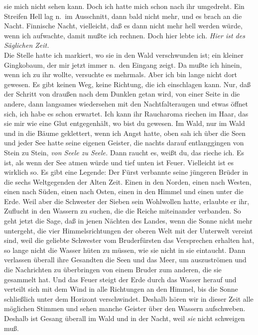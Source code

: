 \documentclass[
]{article}
\begin{document}
sie mich nicht sehen kann. Doch ich hatte mich schon nach ihr umgedreht.
Ein Streifen Hell lag n.~im Ausschnitt, dann bald nicht mehr, und es
brach an die Nacht. Finnische Nacht, vielleicht, daß es dann nicht mehr
hell werden würde, wenn ich aufwachte, damit mußte ich rechnen. Doch
hier lebte ich. \emph{Hier ist des Säglichen Zeit.}\\
Die Stelle hatte ich markiert, wo sie in den Wald verschwunden ist; ein
kleiner Gingkobaum, der mir jetzt immer n.~den Eingang zeigt. Da mußte
ich hinein, wenn ich zu ihr wollte, versuchte es mehrmals. Aber ich bin
lange nicht dort gewesen. Es gibt keinen Weg, keine Richtung, die ich
einschlagen kann. Nur, daß der Schritt von draußen nach dem Dunklen
getan wird, von einer Seite in die andere, dann langsames wiedersehen
mit den Nachtfalteraugen und etwas öffnet sich, ich habe es schon
erwartet. Ich kann ihr Raucharoma riechen im Haar, das sie mir wie eine
Glut entgegenhält, wo bist du gewesen. Im Wald, nur im Wald und in die
Bäume geklettert, wenn ich Angst hatte, oben sah ich über die Seen und
jeder See hatte seine eigenen Geister, die nachts darauf entlanggingen
von Stein zu Stein, \emph{von Seele zu Seele. }Dann raucht es, weißt du,
das rieche ich. Es ist, als wenn der See atmen würde und tief unten ist
Feuer. Vielleicht ist es wirklich so. Es gibt eine Legende: Der Fürst
verbannte seine jüngeren Brüder in die sechs Weltgegenden der Alten
Zeit. Einen in den Norden, einen nach Westen, einen nach Süden, einen
nach Osten, einen in den Himmel und einen unter die Erde. Weil aber die
Schwester der Sieben sein Wohlwollen hatte, erlaubte er ihr, Zuflucht in
den Wassern zu suchen, die die Reiche miteinander verbanden. So geht
jetzt die Sage, daß in jenen Nächten des Landes, wenn die Sonne nicht
mehr untergeht, die vier Himmelsrichtungen der oberen Welt mit der
Unterwelt vereint sind, weil die geliebte Schwester vom Bruderfürsten
das Versprechen erhalten hat, so lange nicht die Wasser hüten zu müssen,
wie sie nicht in sie eintaucht. Dann verlassen überall ihre Gesandten
die Seen und das Meer, um auszuströmen und die Nachrichten zu
überbringen von einem Bruder zum anderen, die sie gesammelt hat. Und das
Feuer steigt der Erde durch das Wasser herauf und verteilt sich mit dem
Wind in alle Richtungen an den Himmel, bis die Sonne schließlich unter
dem Horizont verschwindet. Deshalb hören wir in dieser Zeit alle
möglichen Stimmen und sehen manche Geister über den Wassern aufschweben.
Deshalb ist Gesang überall im Wald und in der Nacht, weil \emph{sie}
nicht schweigen muß.
\end{document}

